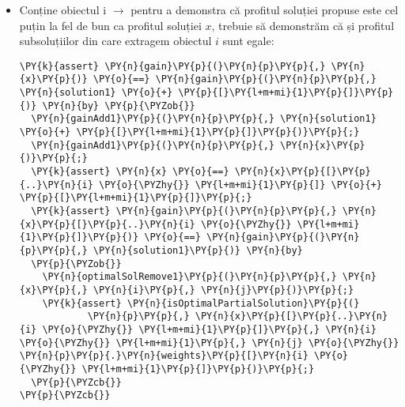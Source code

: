 \begin{sloppypar}
\begin{enumerate}
\begin{itemize}
         \begin{Verbatim}[commandchars=\\\{\}]
\PY{n}{p}\PY{p}{.}\PY{n}{gains}\PY{p}{[}\PY{n}{i} \PY{o}{\PYZhy{}} \PY{l+m+mi}{1}\PY{p}{]} \PY{o}{+} \PY{n}{profit1} \PY{o}{\PYZgt{}} \PY{n}{profit2}
\PY{n}{computeWeight}\PY{p}{(}\PY{n}{p}\PY{p}{,} \PY{n}{solution1} \PY{o}{+} \PY{p}{[}\PY{l+m+mi}{1}\PY{p}{]}\PY{p}{,} \PY{o}{|}\PY{n}{solution1} \PY{o}{+} \PY{p}{[}\PY{l+m+mi}{1}\PY{p}{]}\PY{o}{|} \PY{o}{\PYZhy{}} \PY{l+m+mi}{1}\PY{p}{)} \PY{o}{\PYZlt{}=} \PY{n}{j}
\end{Verbatim}
         că adăugând câștigul obiectului curent obținem un profit mai bun și nu depășim capacitatea $j$, deci ajungem la o contradicție, iar obiectul aparține soluției $x$.
         \item Conține obiectul i $\rightarrow$ pentru a demonstra că profitul soluției propuse este cel puțin la fel de bun ca profitul soluției $x$, trebuie să demonstrăm că și profitul subsoluțiilor din care extragem obiectul $i$ sunt egale:
         \begin{Verbatim}[commandchars=\\\{\}]
\PY{k}{assert} \PY{n}{gain}\PY{p}{(}\PY{n}{p}\PY{p}{,} \PY{n}{x}\PY{p}{)} \PY{o}{==} \PY{n}{gain}\PY{p}{(}\PY{n}{p}\PY{p}{,} \PY{n}{solution1} \PY{o}{+} \PY{p}{[}\PY{l+m+mi}{1}\PY{p}{]}\PY{p}{)} \PY{n}{by} \PY{p}{\PYZob{}} 
  \PY{n}{gainAdd1}\PY{p}{(}\PY{n}{p}\PY{p}{,} \PY{n}{solution1} \PY{o}{+} \PY{p}{[}\PY{l+m+mi}{1}\PY{p}{]}\PY{p}{)}\PY{p}{;}
  \PY{n}{gainAdd1}\PY{p}{(}\PY{n}{p}\PY{p}{,} \PY{n}{x}\PY{p}{)}\PY{p}{;}
  \PY{k}{assert} \PY{n}{x} \PY{o}{==} \PY{n}{x}\PY{p}{[}\PY{p}{..}\PY{n}{i} \PY{o}{\PYZhy{}} \PY{l+m+mi}{1}\PY{p}{]} \PY{o}{+} \PY{p}{[}\PY{l+m+mi}{1}\PY{p}{]}\PY{p}{;}
  \PY{k}{assert} \PY{n}{gain}\PY{p}{(}\PY{n}{p}\PY{p}{,} \PY{n}{x}\PY{p}{[}\PY{p}{..}\PY{n}{i} \PY{o}{\PYZhy{}} \PY{l+m+mi}{1}\PY{p}{]}\PY{p}{)} \PY{o}{==} \PY{n}{gain}\PY{p}{(}\PY{n}{p}\PY{p}{,} \PY{n}{solution1}\PY{p}{)} \PY{n}{by}
  \PY{p}{\PYZob{}}
    \PY{n}{optimalSolRemove1}\PY{p}{(}\PY{n}{p}\PY{p}{,} \PY{n}{x}\PY{p}{,} \PY{n}{i}\PY{p}{,} \PY{n}{j}\PY{p}{)}\PY{p}{;}
    \PY{k}{assert} \PY{n}{isOptimalPartialSolution}\PY{p}{(}
            \PY{n}{p}\PY{p}{,} \PY{n}{x}\PY{p}{[}\PY{p}{..}\PY{n}{i} \PY{o}{\PYZhy{}} \PY{l+m+mi}{1}\PY{p}{]}\PY{p}{,} \PY{n}{i} \PY{o}{\PYZhy{}} \PY{l+m+mi}{1}\PY{p}{,} \PY{n}{j} \PY{o}{\PYZhy{}} \PY{n}{p}\PY{p}{.}\PY{n}{weights}\PY{p}{[}\PY{n}{i} \PY{o}{\PYZhy{}} \PY{l+m+mi}{1}\PY{p}{]}\PY{p}{)}\PY{p}{;}
  \PY{p}{\PYZcb{}} 
\PY{p}{\PYZcb{}}
\end{Verbatim}

\end{itemize}
\end{enumerate}
\end{sloppypar}
